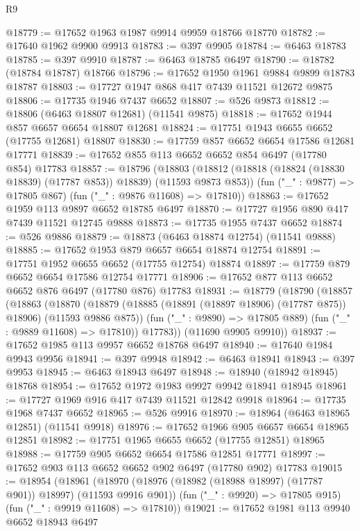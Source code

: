\begin{lexlean}{R9}
\begin{coremodule}
@18779 := @17652 @1963 @1987 @9914 @9959 @18766 @18770
@18782 := @17640 @1962 @9900 @9913
@18783 := @397 @9905
@18784 := @6463 @18783
@18785 := @397 @9910
@18787 := @6463 @18785 @6497
@18790 := @18782 (@18784 @18787) @18766
@18796 := @17652 @1950 @1961 @9884 @9899 @18783 @18787
@18803 := @17727 @1947 @868 @417 @7439 @11521 @12672 @9875
@18806 := @17735 @1946 @7437 @6652
@18807 := @526 @9873
@18812 := @18806 (@6463 @18807 @12681) (@11541 @9875)
@18818 := @17652 @1944 @857 @6657 @6654 @18807 @12681
@18824 := @17751 @1943 @6655 @6652 (@17755 @12681) @18807
@18830 := @17759 @857 @6652 @6654 @17586 @12681 @17771
@18839 := @17652 @855 @113 @6652 @6652 @854 @6497 (@17780 @854) @17783
@18857 := @18796
    (@18803
      (@18812 (@18818 (@18824 (@18830 @18839) (@17787 @853)) @18839) (@11593 @9873 @853))
      (fun ("_" : @9877) => @17805 @867)
      (fun ("_" : @9876 @11608) => @17810))
@18863 := @17652 @1959 @113 @9897 @6652 @18785 @6497
@18870 := @17727 @1956 @890 @417 @7439 @11521 @12745 @9888
@18873 := @17735 @1955 @7437 @6652
@18874 := @526 @9886
@18879 := @18873 (@6463 @18874 @12754) (@11541 @9888)
@18885 := @17652 @1953 @879 @6657 @6654 @18874 @12754
@18891 := @17751 @1952 @6655 @6652 (@17755 @12754) @18874
@18897 := @17759 @879 @6652 @6654 @17586 @12754 @17771
@18906 := @17652 @877 @113 @6652 @6652 @876 @6497 (@17780 @876) @17783
@18931 := @18779
    (@18790
      (@18857
        (@18863
          (@18870
            (@18879 (@18885 (@18891 (@18897 @18906) (@17787 @875)) @18906) (@11593 @9886 @875))
            (fun ("_" : @9890) => @17805 @889)
            (fun ("_" : @9889 @11608) => @17810))
          @17783))
      (@11690 @9905 @9910))
@18937 := @17652 @1985 @113 @9957 @6652 @18768 @6497
@18940 := @17640 @1984 @9943 @9956
@18941 := @397 @9948
@18942 := @6463 @18941
@18943 := @397 @9953
@18945 := @6463 @18943 @6497
@18948 := @18940 (@18942 @18945) @18768
@18954 := @17652 @1972 @1983 @9927 @9942 @18941 @18945
@18961 := @17727 @1969 @916 @417 @7439 @11521 @12842 @9918
@18964 := @17735 @1968 @7437 @6652
@18965 := @526 @9916
@18970 := @18964 (@6463 @18965 @12851) (@11541 @9918)
@18976 := @17652 @1966 @905 @6657 @6654 @18965 @12851
@18982 := @17751 @1965 @6655 @6652 (@17755 @12851) @18965
@18988 := @17759 @905 @6652 @6654 @17586 @12851 @17771
@18997 := @17652 @903 @113 @6652 @6652 @902 @6497 (@17780 @902) @17783
@19015 := @18954
    (@18961
      (@18970 (@18976 (@18982 (@18988 @18997) (@17787 @901)) @18997) (@11593 @9916 @901))
      (fun ("_" : @9920) => @17805 @915)
      (fun ("_" : @9919 @11608) => @17810))
@19021 := @17652 @1981 @113 @9940 @6652 @18943 @6497

\end{coremodule}
\end{lexlean}

